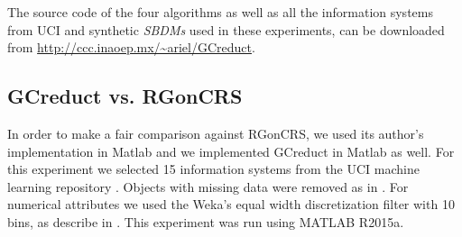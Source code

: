 \documentclass[number,preprint,review,12pt]{elsarticle}
\begin{document}
	The source code of the four algorithms as well as all the information systems from UCI and synthetic \textit{SBDMs} used in these experiments, can be downloaded from \url{http://ccc.inaoep.mx/~ariel/GCreduct}.
	
\subsection{GCreduct vs. RGonCRS}\label{sub:matlab}
	In order to make a fair comparison against RGonCRS, we used its author's implementation in Matlab and we implemented GCreduct in Matlab as well. For this experiment we selected 15 information systems from the UCI machine learning repository \citep{Bache13}. Objects with missing data were removed as in \citep{WangP07}. For numerical attributes we used the Weka's equal width discretization filter with 10 bins, as describe in \cite{Flores2010}. This experiment was run using MATLAB R2015a.
	
\end{document}
